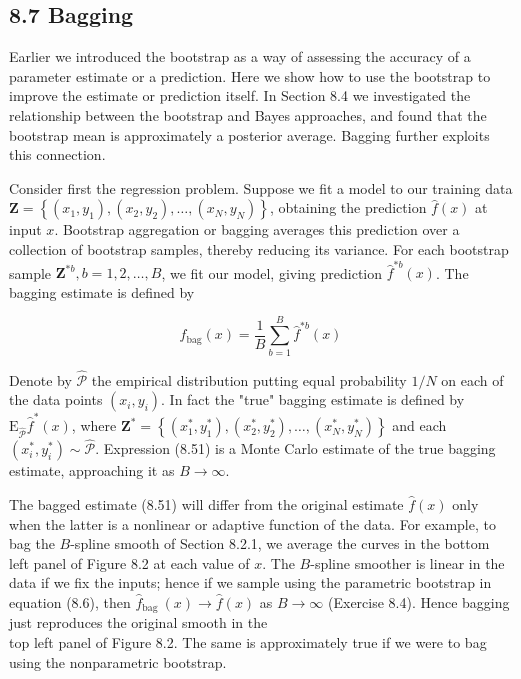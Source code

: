 \documentclass[10pt]{article}
\begin{document}
\subsection*{8.7 Bagging}
Earlier we introduced the bootstrap as a way of assessing the accuracy of a parameter estimate or a prediction. Here we show how to use the bootstrap to improve the estimate or prediction itself. In Section 8.4 we investigated the relationship between the bootstrap and Bayes approaches, and found that the bootstrap mean is approximately a posterior average. Bagging further exploits this connection.

Consider first the regression problem. Suppose we fit a model to our training data $\mathbf{Z}=\left\{\left(x_{1}, y_{1}\right),\left(x_{2}, y_{2}\right), \ldots,\left(x_{N}, y_{N}\right)\right\}$, obtaining the prediction $\hat{f}(x)$ at input $x$. Bootstrap aggregation or bagging averages this prediction over a collection of bootstrap samples, thereby reducing its variance. For each bootstrap sample $\mathbf{Z}^{* b}, b=1,2, \ldots, B$, we fit our model, giving prediction $\hat{f}^{* b}(x)$. The bagging estimate is defined by


\begin{equation*}
\hat{f}_{\mathrm{bag}}(x)=\frac{1}{B} \sum_{b=1}^{B} \hat{f}^{* b}(x) \tag{8.51}
\end{equation*}


Denote by $\hat{\mathcal{P}}$ the empirical distribution putting equal probability $1 / N$ on each of the data points $\left(x_{i}, y_{i}\right)$. In fact the "true" bagging estimate is defined by $\mathrm{E}_{\hat{\mathcal{P}}} \hat{f}^{*}(x)$, where $\mathbf{Z}^{*}=\left\{\left(x_{1}^{*}, y_{1}^{*}\right),\left(x_{2}^{*}, y_{2}^{*}\right), \ldots,\left(x_{N}^{*}, y_{N}^{*}\right)\right\}$ and each $\left(x_{i}^{*}, y_{i}^{*}\right) \sim \hat{\mathcal{P}}$. Expression (8.51) is a Monte Carlo estimate of the true bagging estimate, approaching it as $B \rightarrow \infty$.

The bagged estimate (8.51) will differ from the original estimate $\hat{f}(x)$ only when the latter is a nonlinear or adaptive function of the data. For example, to bag the $B$-spline smooth of Section 8.2.1, we average the curves in the bottom left panel of Figure 8.2 at each value of $x$. The $B$-spline smoother is linear in the data if we fix the inputs; hence if we sample using the parametric bootstrap in equation (8.6), then $\hat{f}_{\text {bag }}(x) \rightarrow \hat{f}(x)$ as $B \rightarrow \infty$ (Exercise 8.4). Hence bagging just reproduces the original smooth in the\\
top left panel of Figure 8.2. The same is approximately true if we were to bag using the nonparametric bootstrap.
\end{document}
